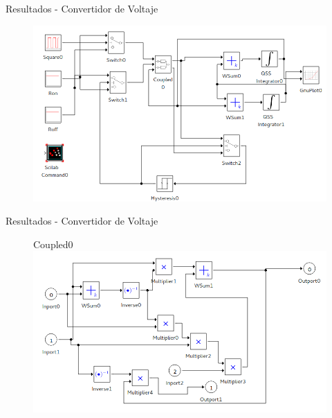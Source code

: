 \documentclass{beamer}
\begin{document}
\begin{frame}{Resultados - Convertidor de Voltaje}
\begin{figure}[H]
\includegraphics[width=\linewidth]{buck_disk}
\end{figure}
\end{frame}

\begin{frame}{Resultados - Convertidor de Voltaje}
\begin{figure}[H]
\centering
Coupled0 \\
\includegraphics[width=\linewidth]{buck_disk_coupled0}
\end{figure}
\end{frame}
\end{document}
